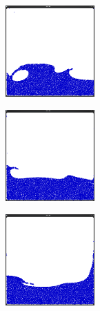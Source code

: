 \begin{figure}[ht!]
\begin{subfigure}[]{}
\end{subfigure}
\begin{subfigure}[]{}
\includegraphics[height=35mm]{png/multigrid9.png}
\end{subfigure}
\begin{subfigure}[]{}
\includegraphics[height=35mm]{png/multigrid10.png}
\end{subfigure}
\begin{subfigure}[]{}
\includegraphics[height=35mm]{png/multigrid11.png}
\end{subfigure}
\caption{}
\label{multigrid}
\end{figure}

\newpage

